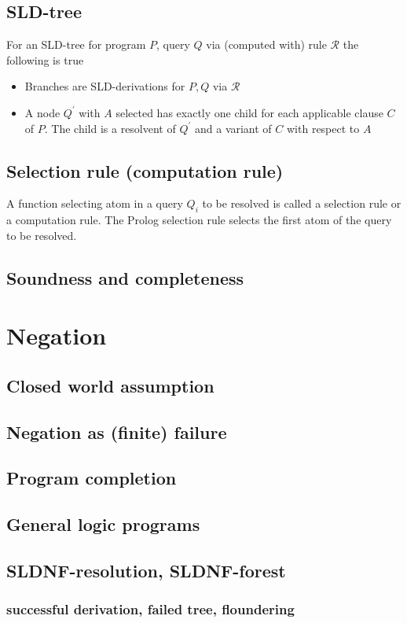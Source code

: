 \documentclass{article}
\begin{document}
\subsection{SLD-tree}
For an SLD-tree for program $P$, query $Q$ via (computed with) rule $\mathcal{R}$ the following is true
\begin{itemize}
    \item Branches are SLD-derivations for $P, Q$ via $\mathcal{R}$
    \item A node $Q^\prime$ with $A$ selected has exactly one child for each applicable clause $C$ of $P$. The child is a resolvent of $Q^\prime$ and a variant of $C$ with respect to $A$
\end{itemize}
\subsection{Selection rule (computation rule)}
A function selecting atom in a query $Q_i$ to be resolved is called a selection rule or a computation rule. The Prolog selection rule selects the first atom of the query to be resolved.


\subsection{Soundness and completeness}

\section{Negation}
\subsection{Closed world assumption}
\subsection{Negation as (finite) failure}
\subsection{Program completion}
\subsection{General logic programs}
\subsection{SLDNF-resolution, SLDNF-forest}
\subsubsection{successful derivation, failed tree, floundering}
\end{document}
